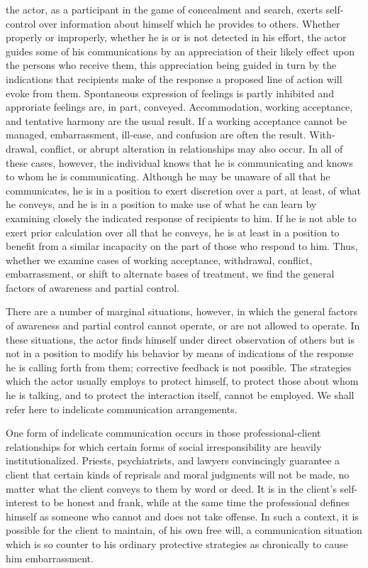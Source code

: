 \documentclass[openany,nobib]{tufte-book}
\begin{document}
the actor, as a participant in the game of
concealment and search, exerts self-control over in­formation about
himself which he provides to others. Whether properly or improperly,
whether he is or is not detected in his effort, the actor guides some of
his communications by an appre­ciation of their likely effect upon the
persons who receive them, this appreciation being guided in turn by the
indications that recipients make of the response a proposed line of
action will evoke from them. Spontaneous expression of feelings is
partly inhibited and approriate feelings are, in part, conveyed.
Ac­commodation, working acceptance, and tentative harmony are the usual
result. If a working acceptance cannot be managed, embarrassment,
ill-ease, and confusion are often the result. With­drawal, conflict, or
abrupt alteration in relationships may also occur. In all of these
cases, however, the individual knows that he is communicating and knows
to whom he is communicating. Although he may be unaware of all that he
communicates, he is in a position to exert discretion over a part, at
least, of what he conveys, and he is in a position to make use of what
he can learn by examining closely the indicated response of recipients
to him. If he is not able to exert prior calculation over all that he
conveys, he is at least in a position to benefit from a similar
incapacity on the part of those who respond to him. Thus, whether we
examine cases of working acceptance, withdrawal, con­flict,
embarrassment, or shift to alternate bases of treatment, we find the
general factors of awareness and partial control.

There are a number of marginal situations, however, in which the general
factors of awareness and partial control can­not operate, or are not
allowed to operate. In these situations, the actor finds himself under
direct observation of others but is not in a position to modify his
behavior by means of indica­tions of the response he is calling forth
from them; corrective feedback is not possible. The strategies which the
actor usually employs to protect himself, to protect those about whom he
is talking, and to protect the interaction itself, cannot be employed.
We shall refer here to indelicate communication arrangements.

One form of indelicate communication occurs in those ­professional-client
relationships for which certain forms of social irresponsibility are
heavily institutionalized. Priests, psychiatrists, and lawyers
convincingly guarantee a client that certain kinds of reprisals and
moral judgments will not be made, no matter what the client conveys to
them by word or deed. It is in the client's self-interest to be honest
and frank, while at the same time the professional defines himself as
someone who cannot and does not take offense. In such a context, it is
pos­sible for the client to maintain, of his own free will, a
com­munication situation which is so counter to his ordinary protective
strategies as chronically to cause him embarrassment.
\end{document}
